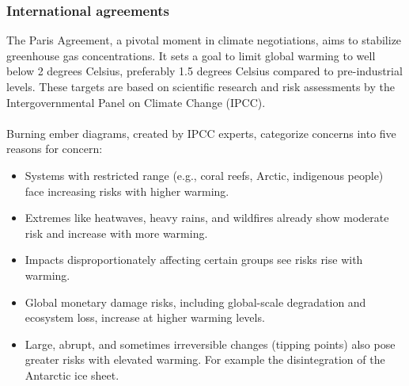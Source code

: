\documentclass[../summary.tex]{subfiles}
\begin{document}
\subsubsection{International agreements}
The Paris Agreement, a pivotal moment in climate negotiations, aims to stabilize greenhouse gas concentrations. It sets a goal to limit global warming to well below 2 degrees Celsius, preferably 1.5 degrees Celsius compared to pre-industrial levels. These targets are based on scientific research and risk assessments by the Intergovernmental Panel on Climate Change (IPCC).\\
\\
Burning ember diagrams, created by IPCC experts, categorize concerns into five reasons for concern:
\begin{itemize}
	\item Systems with restricted range (e.g., coral reefs, Arctic, indigenous people) face increasing risks with higher warming.
	\item Extremes like heatwaves, heavy rains, and wildfires already show moderate risk and increase with more warming.
	\item Impacts disproportionately affecting certain groups see risks rise with warming.
	\item Global monetary damage risks, including global-scale degradation and ecosystem loss, increase at higher warming levels.
	\item Large, abrupt, and sometimes irreversible changes (tipping points) also pose greater risks with elevated warming. For example the disintegration of the Antarctic ice sheet.
\end{itemize}
\end{document}
